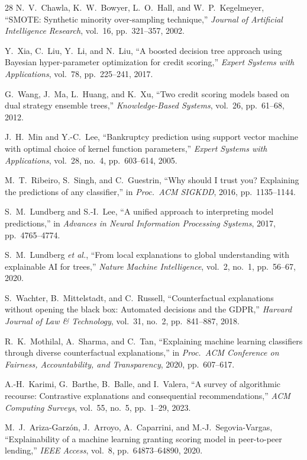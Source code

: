 \documentclass[12pt,a4paper]{report}
\begin{document}
\begin{thebibliography}{28}
 N.~V.~Chawla, K.~W.~Bowyer, L.~O.~Hall, and W.~P.~Kegelmeyer, ``SMOTE: Synthetic minority over-sampling technique,'' \textit{Journal of Artificial Intelligence Research}, vol.~16, pp.~321--357, 2002.

 Y.~Xia, C.~Liu, Y.~Li, and N.~Liu, ``A boosted decision tree approach using Bayesian hyper-parameter optimization for credit scoring,'' \textit{Expert Systems with Applications}, vol.~78, pp.~225--241, 2017.

 G.~Wang, J.~Ma, L.~Huang, and K.~Xu, ``Two credit scoring models based on dual strategy ensemble trees,'' \textit{Knowledge-Based Systems}, vol.~26, pp.~61--68, 2012.

 J.~H.~Min and Y.-C.~Lee, ``Bankruptcy prediction using support vector machine with optimal choice of kernel function parameters,'' \textit{Expert Systems with Applications}, vol.~28, no.~4, pp.~603--614, 2005.

 M.~T.~Ribeiro, S.~Singh, and C.~Guestrin, ``Why should I trust you? Explaining the predictions of any classifier,'' in \textit{Proc.\ ACM SIGKDD}, 2016, pp.~1135--1144.

 S.~M.~Lundberg and S.-I.~Lee, ``A unified approach to interpreting model predictions,'' in \textit{Advances in Neural Information Processing Systems}, 2017, pp.~4765--4774.

 S.~M.~Lundberg \textit{et al.}, ``From local explanations to global understanding with explainable AI for trees,'' \textit{Nature Machine Intelligence}, vol.~2, no.~1, pp.~56--67, 2020.

 S.~Wachter, B.~Mittelstadt, and C.~Russell, ``Counterfactual explanations without opening the black box: Automated decisions and the GDPR,'' \textit{Harvard Journal of Law \& Technology}, vol.~31, no.~2, pp.~841--887, 2018.

 R.~K.~Mothilal, A.~Sharma, and C.~Tan, ``Explaining machine learning classifiers through diverse counterfactual explanations,'' in \textit{Proc.\ ACM Conference on Fairness, Accountability, and Transparency}, 2020, pp.~607--617.

 A.-H.~Karimi, G.~Barthe, B.~Balle, and I.~Valera, ``A survey of algorithmic recourse: Contrastive explanations and consequential recommendations,'' \textit{ACM Computing Surveys}, vol.~55, no.~5, pp.~1--29, 2023.

 M.~J.~Ariza-Garz\'{o}n, J.~Arroyo, A.~Caparrini, and M.-J.~Segovia-Vargas, ``Explainability of a machine learning granting scoring model in peer-to-peer lending,'' \textit{IEEE Access}, vol.~8, pp.~64873--64890, 2020.


\end{thebibliography}
\end{document}
